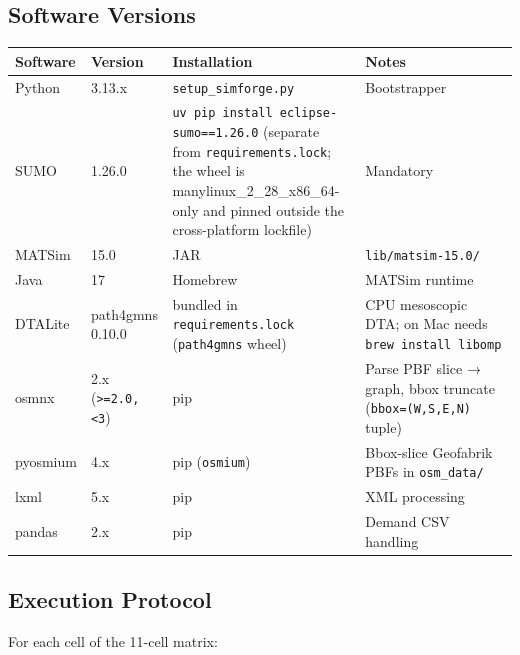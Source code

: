 \subsection{Software Versions}\label{433-software-versions}

\begin{longtable}[]{@{}llll@{}}
\toprule\noalign{}
Software & Version & Installation & Notes \\
\midrule\noalign{}
\endhead
\bottomrule\noalign{}
\endlastfoot
Python & 3.13.x & \texttt{setup\_simforge.py} & Bootstrapper \\
SUMO & 1.26.0 & \texttt{uv\ pip\ install\ eclipse-sumo==1.26.0}
(separate from \texttt{requirements.lock}; the wheel is
manylinux\_2\_28\_x86\_64-only and pinned outside the cross-platform
lockfile) & Mandatory \\
MATSim & 15.0 & JAR & \texttt{lib/matsim-15.0/} \\
Java & 17 & Homebrew & MATSim runtime \\
DTALite & path4gmns 0.10.0 & bundled in \texttt{requirements.lock}
(\texttt{path4gmns} wheel) & CPU mesoscopic DTA; on Mac needs
\texttt{brew\ install\ libomp} \\
osmnx & 2.x (\texttt{\textgreater{}=2.0,\textless{}3}) & pip & Parse PBF
slice → graph, bbox truncate (\texttt{bbox=(W,S,E,N)} tuple) \\
pyosmium & 4.x & pip (\texttt{osmium}) & Bbox-slice Geofabrik PBFs in
\texttt{osm\_data/} \\
lxml & 5.x & pip & XML processing \\
pandas & 2.x & pip & Demand CSV handling \\
\end{longtable}

\subsection{Execution Protocol}\label{434-execution-protocol}

For each cell of the 11-cell matrix:

